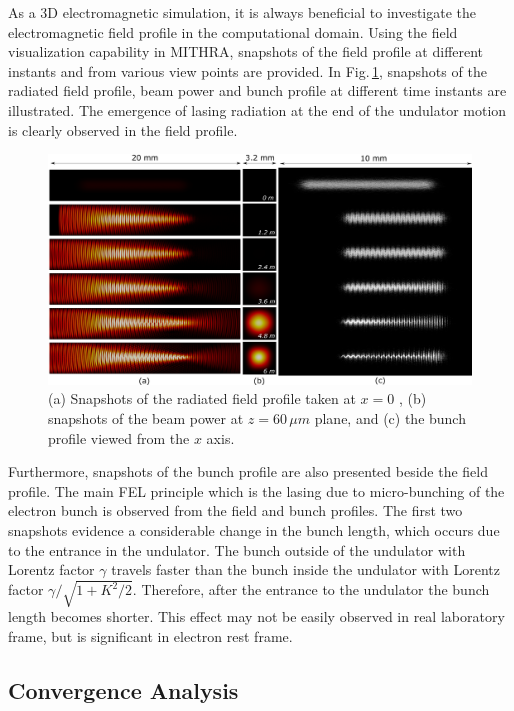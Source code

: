 As a 3D electromagnetic simulation, it is always beneficial to investigate the electromagnetic field profile in the computational domain.
%
Using the field visualization capability in MITHRA, snapshots of the field profile at different instants and from various view points are provided.
%
In Fig.\,\ref{profile-example1}, snapshots of the radiated field profile, beam power and bunch profile at different time instants are illustrated.
%
The emergence of lasing radiation at the end of the undulator motion is clearly observed in the field profile.
%
\begin{figure}
\centering
\includegraphics[width=7.0in]{./MITHRA_EXAMPLES/Fig2/Fig2.pdf}
\caption{(a) Snapshots of the radiated field profile taken at $x=0$ , (b) snapshots of the beam power at $z=60\,\mu m$ plane, and (c) the bunch profile viewed from the $x$ axis.}
\label{profile-example1}
\end{figure}
%
Furthermore, snapshots of the bunch profile are also presented beside the field profile.
%
The main FEL principle which is the lasing due to micro-bunching of the electron bunch is observed from the field and bunch profiles.
%
The first two snapshots evidence a considerable change in the bunch length, which occurs due to the entrance in the undulator.
%
The bunch outside of the undulator with Lorentz factor $\gamma$ travels faster than the bunch inside the undulator with Lorentz factor $\gamma/\sqrt{1+K^2/2}$.
%
Therefore, after the entrance to the undulator the bunch length becomes shorter.
%
This effect may not be easily observed in real laboratory frame, but is significant in electron rest frame.

\subsection{Convergence Analysis}

